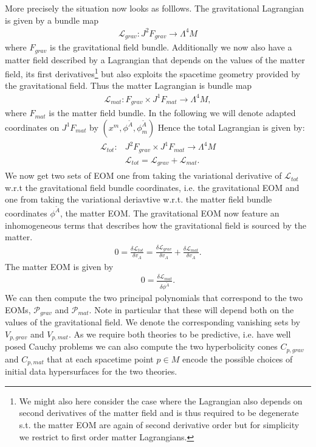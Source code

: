 \documentclass[a4paper,12pt, DIV=14, BCOR=5mm, twoside, headsepline]{scrbook}
\begin{document}
More precisely the situation now looks as folllows.
The gravitational Lagrangian is given by a bundle map 
\begin{align}
    \mathcal{L}_{grav} : J^2F_{grav} \longrightarrow \Lambda^4M
\end{align}
where $F_{grav}$ is the gravitational field bundle. Additionally we now also have a matter field described by a Lagrangian that depends on the values of the matter field, its first derivatives\footnote{We might also here consider the case where the Lagrangian also depends on second derivatives of the matter field and is thus required to be degenerate s.t. the matter EOM are again of second derivative order but for simplicity we restrict to first order matter Lagrangians.} but also exploits the spacetime geometry provided by the gravitational field. Thus the matter Lagrangian is bundle map
\begin{align}
    \mathcal{L}_{mat} : F_{grav} \times J^1F_{mat} \longrightarrow \Lambda^4M,
\end{align}
where $F_{mat}$ is the matter field bundle. In the following we will denote adapted coordinates on $J^1F_{mat}$ by $(x^m,\phi^{\tilde{A}},\phi^{\tilde{A}}_m)$ Hence the total Lagrangian is given by:
\begin{align}
\begin{aligned}
    \mathcal{L}_{tot} : &J^2F_{grav} \times J^1F_{mat} \longrightarrow \Lambda^4M \\
    &\mathcal{L}_{tot} = \mathcal{L}_{grav} + \mathcal{L}_{mat}.
\end{aligned}
\end{align}
We now get two sets of EOM one from taking the variational derivative of $\mathcal{L}_{tot}$ w.r.t the gravitational field bundle coordinates, i.e. the gravitational EOM and one from taking the variational deriavtive w.r.t. the matter field bundle coordinates $\phi^{\tilde{A}}$, the matter EOM.
The gravitational EOM now feature an inhomogeneous terms that describes how the gravitational field is sourced by the matter.
\begin{align}
    0 = \frac{\delta \mathcal{L}_{tot}}{\delta v_A} = \frac{\delta \mathcal{L}_{grav}}{\delta v_A} + \frac{\delta \mathcal{L}_{mat}}{\delta v_A}.
\end{align}
The matter EOM is given by 
\begin{align}
    0 = \frac{\delta \mathcal{L}_{mat}}{\delta \phi^{\tilde{A}}}.
\end{align}
We can then compute the two principal polynomials that correspond to the two EOMs, $\mathcal{P}_{grav}$ and $\mathcal{P}_{mat}$. Note in particular that these will depend both on the values of the gravitational field. We denote the corresponding vanishing sets by $V_{p,grav}$ and $V_{p,mat}$. As we require both theories to be predictive, i.e. have well posed Cauchy problems we can also compute the two hyperbolicity cones $C_{p,grav}$ and $C_{p,mat}$ that at each spacetime point $p\in M$ encode the possible choices of initial data hypersurfaces for the two theories. 
\end{document}
